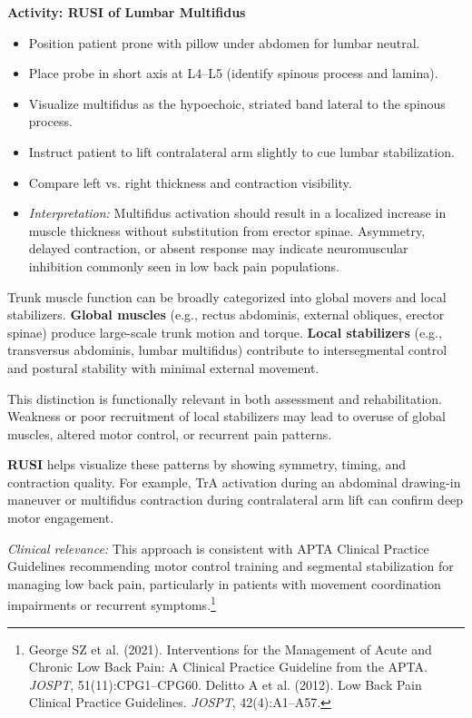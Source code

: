 \begin{labactivitybox}
\textbf{Activity: RUSI of Lumbar Multifidus}

\begin{itemize}
  \item Position patient prone with pillow under abdomen for lumbar neutral.
  \item Place probe in short axis at L4–L5 (identify spinous process and lamina).
  \item Visualize multifidus as the hypoechoic, striated band lateral to the spinous process.
  \item Instruct patient to lift contralateral arm slightly to cue lumbar stabilization.
  \item Compare left vs. right thickness and contraction visibility.
  \item \textit{Interpretation:} Multifidus activation should result in a localized increase in muscle thickness without substitution from erector spinae. Asymmetry, delayed contraction, or absent response may indicate neuromuscular inhibition commonly seen in low back pain populations.
\end{itemize}
\end{labactivitybox}

\begin{tcolorbox}[colback=gray!5, colframe=black, title=Global Movers vs. Local Stabilizers]

Trunk muscle function can be broadly categorized into global movers and local stabilizers. \textbf{Global muscles} (e.g., rectus abdominis, external obliques, erector spinae) produce large-scale trunk motion and torque. \textbf{Local stabilizers} (e.g., transversus abdominis, lumbar multifidus) contribute to intersegmental control and postural stability with minimal external movement.

This distinction is functionally relevant in both assessment and rehabilitation. Weakness or poor recruitment of local stabilizers may lead to overuse of global muscles, altered motor control, or recurrent pain patterns.

\textbf{RUSI} helps visualize these patterns by showing symmetry, timing, and contraction quality. For example, TrA activation during an abdominal drawing-in maneuver or multifidus contraction during contralateral arm lift can confirm deep motor engagement.

\textit{Clinical relevance:} This approach is consistent with APTA Clinical Practice Guidelines recommending motor control training and segmental stabilization for managing low back pain, particularly in patients with movement coordination impairments or recurrent symptoms.\footnote{George SZ et al. (2021). Interventions for the Management of Acute and Chronic Low Back Pain: A Clinical Practice Guideline from the APTA. \textit{JOSPT}, 51(11):CPG1–CPG60. Delitto A et al. (2012). Low Back Pain Clinical Practice Guidelines. \textit{JOSPT}, 42(4):A1–A57.}

\end{tcolorbox}

